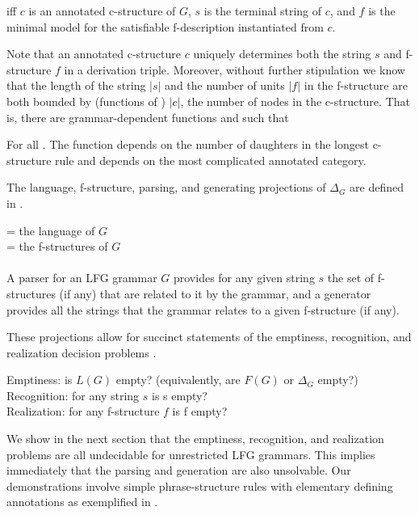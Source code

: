 \documentclass[output=paper,hidelinks]{langscibook}
\begin{document}
\ea\label{delta} 
 iff $c$ is an annotated c-structure of $G$, $s$ is the terminal string of $c$, and $f$ is the minimal model for the satisfiable f-description instantiated from $c$.
\z

 \noindent Note that an annotated c-structure $c$ uniquely determines both the string $s$ and f-structure $f$ in a derivation triple.  Moreover, without further stipulation we know that the length of the string $|s|$ and the number of units $|f|$ in the f-structure are both bounded by (functions of ) $|c|$, the number of nodes in the c-structure.    That is, there are grammar-dependent functions  and  such that
  
  \ea\label{scfbounds}
 For all .
 \z
The function   depends on the number of daughters in the longest c-structure rule and  depends on the most complicated annotated category.
 
The language, f-structure, parsing, and generating projections of $\Delta_G$ are defined in .

\ea\label{deltaprojs}
 = the language of $G$\\
 = the f-structures of $G$\\
 \\
\z
\noindent A parser for an LFG grammar $G$ provides for any given string $s$ the set of f-structures (if any) that are related to it by the grammar, and a generator provides all the strings that the grammar relates to a given f-structure (if any).

These projections allow for succinct statements of the emptiness, recognition, and realization decision problems .

\ea\label{probs}
Emptiness:  is $L(G)$ empty? (equivalently, are $F(G)$ or $\Delta_G$ empty?)\\
Recognition: for any string $s$ is \ParG s empty?\\
Realization:  for any f-structure $f$ is \GenG f empty?
\z

\noindent We show in the next section that the emptiness, recognition, and realization problems are all undecidable for unrestricted LFG grammars.  This implies immediately that the parsing and generation are also unsolvable. Our demonstrations involve simple phrase-structure rules with elementary defining annotations as exemplified in . 
\end{document}
